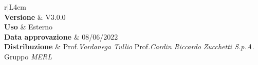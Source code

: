 \begin{center}
	\begin{tabular}{r|L{4cm}}
		 \\
		\hline
		\textbf{Versione}			& V3.0.0 \\
		\textbf{Uso}		& Esterno \\
		\textbf{Data approvazione} 			& 08/06/2022 \\
		\textbf{Distribuzione} 	&	Prof.\textit{Vardanega Tullio} \newline Prof.\textit{Cardin Riccardo} \newline \textit{Zucchetti S.p.A.} \newline Gruppo \textit{MERL} \\
	\end{tabular}
\end{center}
